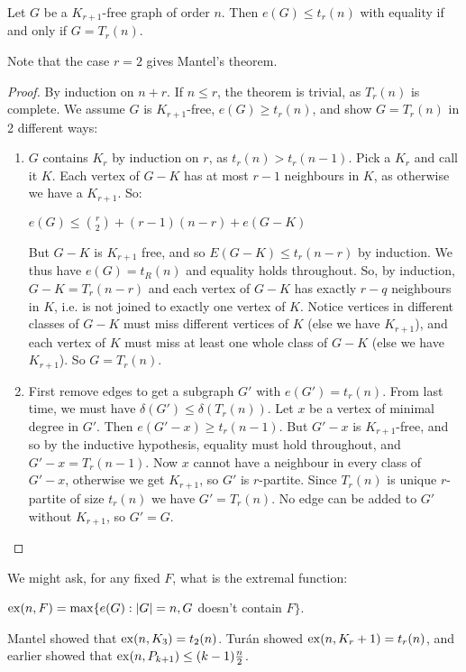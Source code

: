 \documentclass[10pt,a4paper]{article}
\begin{document}
\begin{theorem}[Tur\'an 1941]
Let $G$ be a $K_{r+1}$-free graph of order $n$. Then $e(G) \leq t_r(n)$ with equality if and only if $G=T_r(n)$.
\end{theorem}
Note that the case $r=2$ gives Mantel's theorem.
\begin{proof}
By induction on $n+r$. If $n \leq r$, the theorem is trivial, as $T_r(n)$ is complete. We assume $G$ is $K_{r+1}$-free, $e(G) \geq t_r(n)$, and show $G=T_r(n)$ in 2 different ways:
\begin{enumerate}
\item $G$ contains $K_r$ by induction on $r$, as $t_r(n) > t_r(n-1)$. Pick a $K_r$ and call it $K$. Each vertex of $G-K$ has at most $r-1$ neighbours in $K$, as otherwise we have a $K_{r+1}$. So:
\begin{center}
$e(G) \leq \binom{r}{2} + (r-1)(n-r) + e(G-K)$
\end{center}
But $G-K$ is $K_{r+1}$ free, and so $E(G-K) \leq t_r(n-r)$ by induction. We thus have $e(G) = t_R(n)$ and equality holds throughout. So, by induction, $G-K = T_r(n-r)$ and each vertex of $G-K$ has exactly $r-q$ neighbours in $K$, i.e. is not joined to exactly one vertex of $K$. Notice vertices in different classes of $G-K$ must miss different vertices of $K$ (else we have $K_{r+1}$), and each vertex of $K$ must miss at least one whole class of $G-K$ (else we have $K_{r+1}$). So $G = T_r(n)$.

\item First remove edges to get a subgraph $G'$ with $e(G') = t_r(n)$. From last time, we must have $\delta(G') \leq \delta(T_r(n))$. Let $x$ be a vertex of minimal degree in $G'$. Then $e(G'-x) \geq t_r(n-1)$. But $G'-x$ is $K_{r+1}$-free, and so by the inductive hypothesis, equality must hold throughout, and $G'-x=T_r(n-1)$. Now $x$ cannot have a neighbour in every class of $G'-x$, otherwise we get $K_{r+1}$, so $G'$ is $r$-partite. Since $T_r(n)$ is unique $r$-partite of size $t_r(n)$ we have $G'=T_r(n)$. No edge can be added to $G'$ without $K_{r+1}$, so $G'=G$. 
\end{enumerate}
\end{proof}

We might ask, for any fixed $F$, what is the extremal function:
\begin{center}
$\operatorname{ex}(n,F) = \max\{e(G) : |G|=n, G $ doesn't contain $F\}$. 
\end{center}
Mantel showed that $\operatorname{ex}(n,K_3)=t_2(n)$. Tur\'an showed $\operatorname{ex}(n,K_r+1)=t_r(n)$, and earlier showed that $\operatorname{ex}(n,P_{k+1}) \leq (k-1)\frac{n}{2}$.
\end{document}

